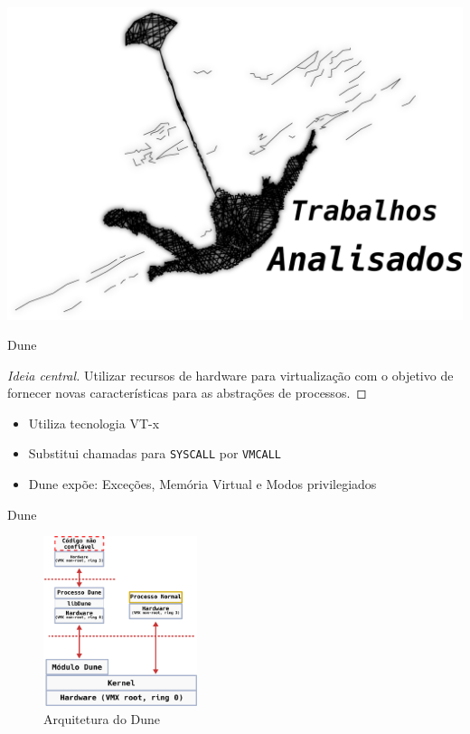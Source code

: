 \documentclass[xcolor={usenames,svgnames,dvipsnames},brazil,english,12pt,aspectratio=149]{beamer}
\begin{document}
\begin{frame}[plain]
  \includegraphics[width=\textwidth]{presentation_cap2_zero}
\end{frame}

\begin{frame}{Dune}

  \begin{proof}[Ideia central]
Utilizar recursos de hardware para virtualização com o objetivo de fornecer
novas características para as abstrações de processos.
  \end{proof}

    \begin{itemize}
      \item Utiliza tecnologia VT-x
      \item Substitui chamadas para \texttt{SYSCALL} por \texttt{VMCALL}
      \item Dune expõe: Exceções, Memória Virtual e Modos privilegiados
    \end{itemize}

\end{frame}

\begin{frame}{Dune}
  \begin{figure}[!h]
    \centering
    \includegraphics[width=0.4\textwidth]{dune_architecture} 
    \caption*{Arquitetura do Dune}
  \end{figure}
\end{frame}
\end{document}
